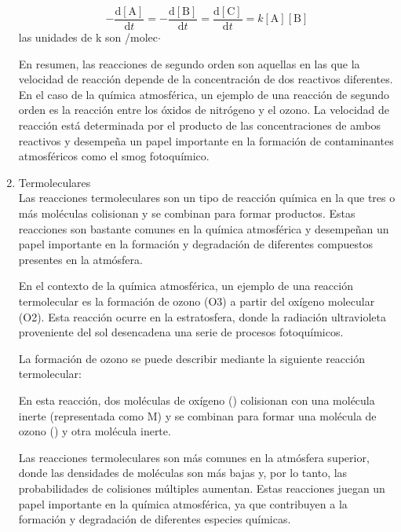 \begin{enumerate}
 \begin{equation*}
	-\frac{\mathrm{d}[\textrm{A}]}{\mathrm{d}t}=-\frac{\mathrm{d}[\textrm{B}]}{\mathrm{d}t}=\frac{\mathrm{d}[\textrm{C}]}{\mathrm{d}t}=k[\textrm{A}][\textrm{B}]
	\end{equation*}
	las unidades de k son {\centi\cubic\metre}/{molec$\cdot $\second}
	
En resumen, las reacciones de segundo orden son aquellas en las que la velocidad de reacción depende de la concentración de dos reactivos diferentes. En el caso de la química atmosférica, un ejemplo de una reacción de segundo orden es la reacción entre los óxidos de nitrógeno y el ozono. La velocidad de reacción está determinada por el producto de las concentraciones de ambos reactivos y desempeña un papel importante en la formación de contaminantes atmosféricos como el smog fotoquímico.

\item Termoleculares \\
Las reacciones termoleculares son un tipo de reacción química en la que tres o más moléculas colisionan y se combinan para formar productos. Estas reacciones son bastante comunes en la química atmosférica y desempeñan un papel importante en la formación y degradación de diferentes compuestos presentes en la atmósfera.

En el contexto de la química atmosférica, un ejemplo de una reacción termolecular es la formación de ozono (O3) a partir del oxígeno molecular (O2). Esta reacción ocurre en la estratosfera, donde la radiación ultravioleta proveniente del sol desencadena una serie de procesos fotoquímicos.

La formación de ozono se puede describir mediante la siguiente reacción termolecular:


En esta reacción, dos moléculas de oxígeno () colisionan con una molécula inerte (representada como M) y se combinan para formar una molécula de ozono () y otra molécula inerte.

Las reacciones termoleculares son más comunes en la atmósfera superior, donde las densidades de moléculas son más bajas y, por lo tanto, las probabilidades de colisiones múltiples aumentan. Estas reacciones juegan un papel importante en la química atmosférica, ya que contribuyen a la formación y degradación de diferentes especies químicas.


\end{enumerate}
